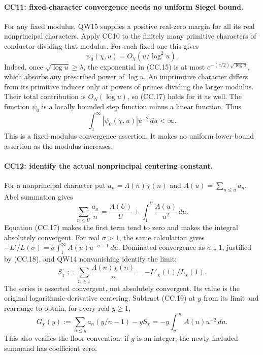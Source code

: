 \paragraph{CC11: fixed-character convergence needs no uniform Siegel bound.}
For any fixed modulus, QW15 supplies a positive real-zero
margin for all its real nonprincipal characters. Apply CC10
to the finitely many primitive characters of conductor dividing
that modulus. For each fixed one this gives
\[
                \psi_0(\chi,u)=O_\chi(u/\log^2u).       \tag{CC.17}
\]
Indeed, once $\sqrt{\log u}\ge\lambda$, the exponential
in (CC.15) is at most $e^{-(c/2)\sqrt{\log u}}$, which absorbs
any prescribed power of $\log u$. An imprimitive character
differs from its primitive inducer only at powers of primes
dividing the larger modulus. Their total contribution is
$O_N(\log u)$, so (CC.17) holds for it as well.
The function $\psi_0$ is a locally bounded step function minus
a linear function. Thus
\[
                   \int_1^\infty
                       |\psi_0(\chi,u)|u^{-2}\,du<\infty.
                                                               \tag{CC.18}
\]
This is a fixed-modulus convergence assertion. It makes no
uniform lower-bound assertion as the modulus increases.

\paragraph{CC12: identify the actual nonprincipal centering constant.}
For a nonprincipal character put $a_n=\Lambda(n)\chi(n)$
and $A(u)=\sum_{n\le u}a_n$. Abel summation gives
\[
 \sum_{n\le U}\frac{a_n}{n}
             =\frac{A(U)}U+\int_1^U\frac{A(u)}{u^2}\,du.
                                                               \tag{CC.19}
\]
Equation (CC.17) makes the first term tend to zero and makes
the integral absolutely convergent. For real $\sigma>1$,
the same calculation gives
$-L'/L(\sigma)=\sigma\int_1^\infty A(u)u^{-\sigma-1}\,du$.
Dominated convergence as $\sigma\downarrow1$, justified by
(CC.18), and QW14 nonvanishing identify the limit:
\[
 S_\chi:=\sum_{n\ge1}\frac{\Lambda(n)\chi(n)}n
                         =-L'_\chi(1)/L_\chi(1).        \tag{CC.20}
\]
The series is asserted convergent, not absolutely convergent.
Its value is the original logarithmic-derivative centering.
Subtract (CC.19) at $y$ from its limit and rearrange to obtain,
for every real $y\ge1$,
\[
 G_\chi(y):=\sum_{n\le y}a_n(y/n-1)-yS_\chi
                       =-y\int_y^\infty A(u)u^{-2}\,du.
                                                               \tag{CC.21}
\]
This also verifies the floor convention: if $y$ is an integer,
the newly included summand has coefficient zero.

